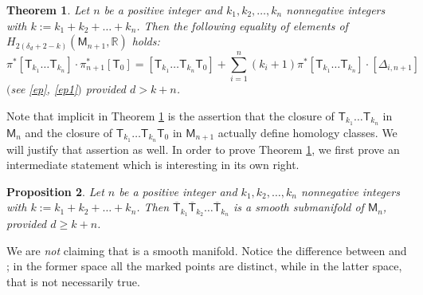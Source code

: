 \documentclass[pdftex]{sigma}
\numberwithin{equation}{section}
\newtheorem{thm}{Theorem}[section]
\newtheorem{prp}[thm]{Proposition}
\begin{document}
\begin{thm}\label{theorem_for_many_Tks}
Let $n$ be a positive integer and $k_1, k_2,\dots, k_{n}$ nonnegative integers
with
$
k :=  k_1+k_2+\dots +k_n$.
Then the following equality of elements of $H_{2(\delta_d+2- k)}(\mathsf{M}_{n+1}, {\mathbb R})$ holds:
\begin{equation}\label{many_Tks}
\pi^{\ast}[\mathsf{T}_{k_1}\dots \mathsf{T}_{k_n}]\cdot
\pi_{n+1}^{\ast}[\mathsf{T}_0] =
[\mathsf{T}_{k_1}\dots \mathsf{T}_{k_n} \mathsf{T}_{0}]
 + \sum_{i=1}^{n}(k_i+1) \pi^{\ast}[\mathsf{T}_{k_1}\dots \mathsf{T}_{k_n}] \cdot [\Delta_{i, {n+1}}]
\end{equation}
$($see \eqref{ep}, \eqref{ep1}$)$ provided $d > k+n$.
\end{thm}

Note that implicit in Theorem \ref{theorem_for_many_Tks} is the assertion that
the closure of $\mathsf{T}_{k_1}\dots \mathsf{T}_{k_n}$ in
$\mathsf{M}_n$ and the closure of
$\mathsf{T}_{k_1}\dots \mathsf{T}_{k_n} \mathsf{T}_{0}$ in $\mathsf{M}_{n+1}$
actually define homology classes. We will justify that assertion as well.
In order to prove Theorem \ref{theorem_for_many_Tks}, we first prove an intermediate statement
which is interesting in its own right.
\begin{prp}
\label{prp_smth_mfld}
Let $n$ be a positive integer and $k_1, k_2,\dots, k_{n}$ nonnegative integers
with
$ k :=  k_1+k_2+\dots +k_n$.
Then $\overline{\mathsf{T}}_{k_1} \overline{\mathsf{T}}_{k_2}\dots \overline{\mathsf{T}}_{k_n}$
is a smooth submanifold of $\mathsf{M}_{n}$, provided
$d \geq k+n$.
\end{prp}

\begin{rem}
 We are \emph{not} claiming that
is a smooth manifold. Notice the difference between
and ; in the former space
all the marked points are distinct, while in the latter space, that is not necessarily true.
\end{rem}
\end{document}
